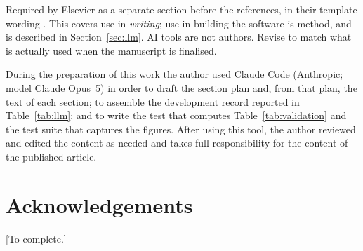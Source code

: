 \begin{plan}
Required by Elsevier as a separate section before the references, in their template wording \citep{elsevierAI}. This covers use in \emph{writing}; use in building the software is method, and is described in Section~\ref{sec:llm}. AI tools are not authors. Revise to match what is actually used when the manuscript is finalised.
\end{plan}

During the preparation of this work the author used Claude Code (Anthropic; model Claude Opus~5) in order to draft the section plan and, from that plan, the text of each section; to assemble the development record reported in Table~\ref{tab:llm}; and to write the test that computes Table~\ref{tab:validation} and the test suite that captures the figures. After using this tool, the author reviewed and edited the content as needed and takes full responsibility for the content of the published article.

\section*{Acknowledgements}
[To complete.]

